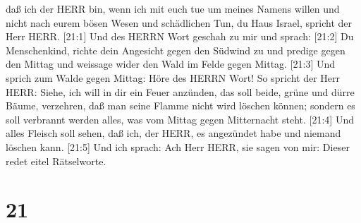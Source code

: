 daß ich der HERR bin, wenn ich mit euch tue um meines Namens willen und
nicht nach eurem bösen Wesen und schädlichen Tun, du Haus Israel,
spricht der Herr HERR.  {[}21:1{]} Und des HERRN Wort
geschah zu mir und sprach:  {[}21:2{]} Du Menschenkind,
richte dein Angesicht gegen den Südwind zu und predige gegen den Mittag
und weissage wider den Wald im Felde gegen Mittag. 
{[}21:3{]} Und sprich zum Walde gegen Mittag: Höre des HERRN Wort! So
spricht der Herr HERR: Siehe, ich will in dir ein Feuer anzünden, das
soll beide, grüne und dürre Bäume, verzehren, daß man seine Flamme nicht
wird löschen können; sondern es soll verbrannt werden alles, was vom
Mittag gegen Mitternacht steht.  {[}21:4{]} Und alles
Fleisch soll sehen, daß ich, der HERR, es angezündet habe und niemand
löschen kann.  {[}21:5{]} Und ich sprach: Ach Herr HERR,
sie sagen von mir: Dieser redet eitel Rätselworte.

\hypertarget{section-20}{%
\section{21}\label{section-20}}

